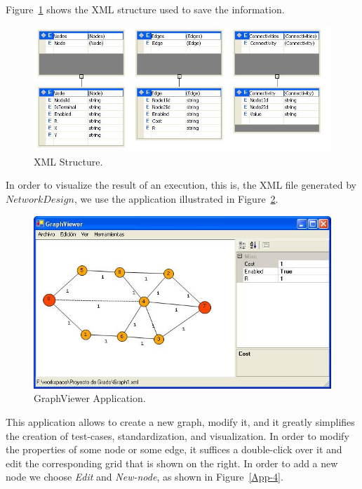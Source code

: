 Figure~\ref{App-2} shows the XML structure used to save the information. 

\begin{figure}[H]
\begin{center}
\includegraphics[scale=0.8]{6.jpg}
\caption{XML Structure.}\label{App-2}
\end{center} 
\end{figure}

In order to visualize the result of an execution, this is, the XML file generated by $NetworkDesign$, 
we use the application illustrated in Figure~\ref{App-3}. 

\begin{figure}[H]
\begin{center}
\includegraphics[scale=0.75]{7.jpg}
\caption{GraphViewer Application.}\label{App-3}
\end{center} 
\end{figure}
This application allows to create a new graph, modify it, and it greatly simplifies the creation of test-cases, 
standardization, and visualization. In order to modify the properties of some node or some edge, it suffices 
a double-click over it and edit the corresponding grid that is shown on the right. In order to add a new node we 
choose \emph{Edit} and \emph{New-node}, as shown in Figure~\ref{App-4}.

